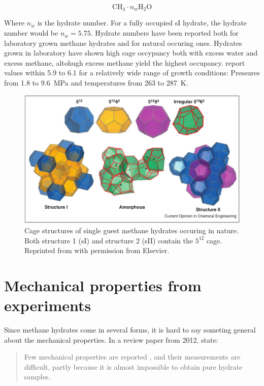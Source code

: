 \begin{equation}
	\mathrm{CH_4} \cdot n_w \mathrm{H_2O}
\end{equation}

Where $n_w$ is the hydrate number. For a fully occupied sI hydrate, the hydrate number would be $n_w = 5.75$. Hydrate numbers have been reported both for laboratory grown methane hydrates and for natural occuring ones. Hydrates grown in laboratory have shown high cage occypancy both with excess water and excess methane, altohugh excess methane yield the highest occupancy. \citet{Circone2005} report values within 5.9 to 6.1 for a relatively wide range of growth conditions: Pressures from 1.8 to \SI{9.6}{\mega\pascal} and temperatures from 263 to \SI{287}{\kelvin}. 

\begin{figure}
\includegraphics[width=15cm]{../pictures/hydrate_structures.png}
\caption{Cage structures of single guest methane hydrates occuring in nature. Both structure 1 (sI) and structure 2 (sII) contain the $5^{12}$ cage. Reprinted from \citet{Barnes2013} with permission from Elsevier.}
\label{fig:methane_hydrate_structure}
\end{figure}


\section{Mechanical properties from experiments}
Since methane hydrates come in several forms, it is hard to say someting general about the mechanical properties. In a review paper from 2012, \citet{Ning2012} state:
\begin{quotation}
Few mechanical properties are reported , and their measurements are difficult, partly because it is almost impossible to obtain pure hydrate samples.
\end{quotation}

